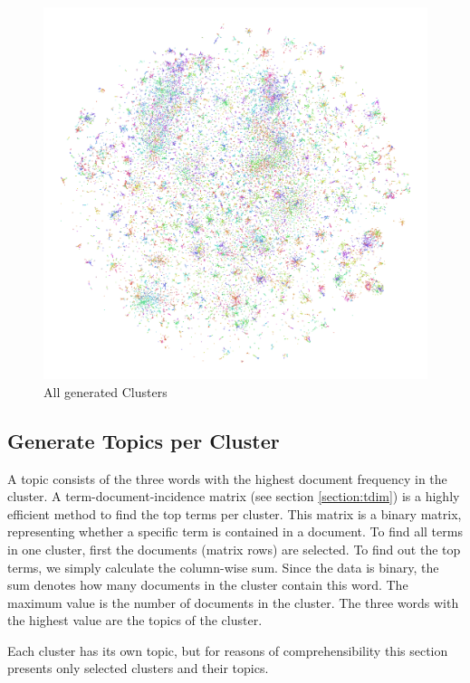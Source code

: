 \begin{figure}[!ht]
	\centering
	\includegraphics[width=\linewidth]{Bilder/models/minibatchkmeans.pdf}
	\caption{All generated Clusters}
	\label{fig:kmeans}
\end{figure}


\newpage
\subsection{Generate Topics per Cluster}
\label{section:topics}
A topic consists of the three words with the highest document frequency in the cluster. A term-document-incidence matrix (see section \ref{section:tdim}) is a highly efficient method to find the top terms per cluster. This matrix is a binary matrix, representing whether a specific term is contained in a document. To find all terms in one cluster, first the documents (matrix rows) are selected. To find out the top terms, we simply calculate the column-wise sum. Since the data is binary, the sum denotes how many documents in the cluster contain this word. The maximum value is the number of documents in the cluster. The three words with the highest value are the topics of the cluster.

Each cluster has its own topic, but for reasons of comprehensibility this section presents only selected clusters and their topics.


